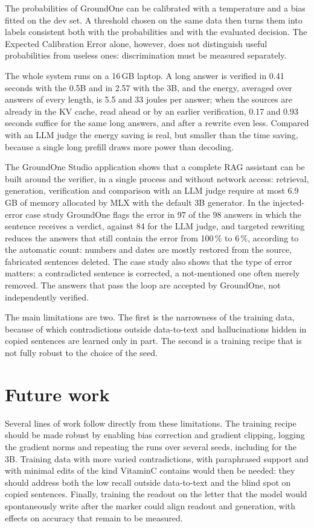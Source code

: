The probabilities of GroundOne can be calibrated with a temperature and a bias fitted on the dev set. A threshold chosen
on the same data then turns them into labels consistent both with the probabilities and with the evaluated decision.
The Expected Calibration Error alone, however, does not distinguish useful probabilities from useless ones:
discrimination must be measured separately.

The whole system runs on a 16\,GB laptop. A long answer is verified in 0.41 seconds with the 0.5B and in 2.57 with the 3B, and the energy, averaged over answers of every length, is 5.5 and 33 joules per answer; when the sources are already in the KV cache, read ahead or by an earlier verification, 0.17 and 0.93 seconds suffice for the same long answers, and after a rewrite even less. Compared with an LLM judge the energy saving is
real, but smaller than the time saving, because a single long prefill draws more power than decoding.

The GroundOne Studio application shows that a complete RAG assistant can be built around the verifier, in a single
process and without network access: retrieval, generation, verification and comparison with an LLM judge require at most 6.9\,GB of memory allocated by MLX with the default 3B generator. In the injected-error case study GroundOne flags the error in 97 of the 98
answers in which the sentence receives a verdict, against 84 for the LLM judge, and targeted rewriting reduces the answers
that still contain the error from 100\,\% to 6\,\%, according to the automatic count: numbers and dates are mostly
restored from the source, fabricated sentences deleted. The case study also shows that the type of error matters: a
contradicted sentence is corrected, a not-mentioned one often merely removed. The answers that pass the loop are
accepted by GroundOne, not independently verified.

The main limitations are two. The first is the narrowness of the training data, because of which contradictions outside
data-to-text and hallucinations hidden in copied sentences are learned only in part. The second is a training recipe that
is not fully robust to the choice of the seed.

\section{Future work}
\label{sec:concl-future}

Several lines of work follow directly from these limitations. The training recipe should be made robust by enabling bias
correction and gradient clipping, logging the gradient norms and repeating the runs over several seeds, including for the
3B. Training data with more varied contradictions, with paraphrased support and with minimal edits of the kind VitaminC
contains would then be needed: they should address both the low recall outside data-to-text and the blind spot on copied
sentences. Finally, training the readout on the letter that the model would spontaneously write after the marker could
align readout and generation, with effects on accuracy that remain to be measured.

